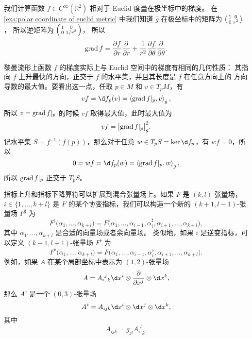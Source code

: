 \begin{example}
  我们计算函数 $f\in C^\infty(\mathbb{R}^2)$ 相对于 Euclid 度量在极坐标中的梯度。
  在 \autoref{exa:polar coordinate of euclid metric} 中我们知道 $\bar g$
  在极坐标中的矩阵为 $\begin{psmallmatrix}1 & 0 \\ 0 & r^2\end{psmallmatrix}$，
  所以逆矩阵为 $\begin{psmallmatrix}1 & 0 \\ 0 & 1/r^2\end{psmallmatrix}$，
  所以 
  \[
    \operatorname{grad} f=\frac{\partial f}{\partial r}\frac{\partial}{\partial r}+
    \frac{1}{r^2}\frac{\partial f}{\partial\theta}  \frac{\partial}{\partial \theta}.
  \]
\end{example}

黎曼流形上函数 $f$ 的梯度实际上与 Euclid 空间中的梯度有相同的几何性质：
其指向 $f$ 上升最快的方向，正交于 $f$ 的水平集，并且其长度是 $f$ 在任意方向上的
方向导数的最大值。要看出这一点，任取 $p\in M$ 和 $v\in T_pM$，有
\[
  vf=\d f_p(v)=  \inn{\grad f|_p,v}_g,
\]
所以 $v=\operatorname{grad} f|_p$ 的时候 $vf$ 取得最大值，此时最大值为
\[
  vf=\bigl|\operatorname{grad} f|_p\bigr|_g^2.
\]
记水平集 $S=f^{-1}(f(p))$，那么对于任意 $w\in T_pS=\ker \d f_p$，有 $wf=0$，所以
\[
  0=wf=\d f_p(w)=\inn{\grad f|_p,w}_g,
\]
所以 $\operatorname{grad} f|_p$ 正交于 $T_pS$。

指标上升和指标下降算符可以扩展到混合张量场上。如果 $F$ 是 $(k,l)$-张量场，
$i\in\{1,\dots,k+l\}$ 是 $F$ 的某个协变指标，我们可以构造一个新的 $(k+1,l-1)$-张量场
$F^\sharp$ 为
\[
  F^\sharp\bigl(\alpha_1,\dots,\alpha_{k+l}\bigr)=
  F\bigl(\alpha_1,\dots,\alpha_{i-1},\alpha_i^\sharp,\alpha_{i+1},\dots,\alpha_{k+l}\bigr),
\]
其中 $\alpha_1,\dots,\alpha_{k+l}$ 是合适的向量场或者余向量场。
类似地，如果 $i$ 是逆变指标，可以定义 $(k-1,l+1)$-张量场 $F^\flat$
为
\[
  F^\flat\bigl(\alpha_1,\dots,\alpha_{k+l}\bigr)=
  F\bigl(\alpha_1,\dots,\alpha_{i-1},\alpha_i^\flat,\alpha_{i+1},\dots,\alpha_{k+l}\bigr).
\]
例如，如果 $A$ 在某个局部坐标中表示为 $(1,2)$-张量场
\[
  A={{A_{i}}^j}_k\d x^i\otimes \frac{\partial}{\partial x^j}\otimes \d x^k,
\]
那么 $A^\flat$ 是一个 $(0,3)$-张量场
\[
  A^\flat =A_{ijk}\d x^i\otimes \d x^j\otimes \d x^k,  
\]
其中
\[
  A_{ijk}= g_{jl}  {{A_{i}}^l}_k.
\]

